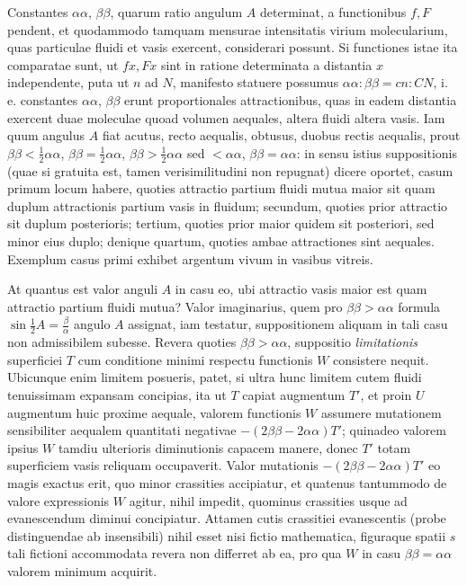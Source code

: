 Constantes $\alpha\alpha$, $\beta\beta$, quarum ratio angulum $A$ determinat, a functionibus $f,F$ pendent, et quodammodo tamquam mensurae intensitatis virium molecularium, quas particulae fluidi et vasis exercent, considerari possunt. Si functiones istae ita comparatae sunt, ut $fx,Fx$ sint in ratione determinata a distantia $x$ independente, puta ut $n$ ad $N$, manifesto statuere possumus
$\alpha\alpha:\beta\beta=cn:CN$, i. e. constantes $\alpha\alpha$, $\beta\beta$ erunt proportionales attractionibus, quas in eadem distantia exercent duae moleculae quoad volumen aequales, altera fluidi altera vasis. Iam quum angulus $A$ fiat acutus, recto aequalis, obtusus, duobus rectis aequalis, prout $\beta\beta<\frac12\alpha\alpha$, $\beta\beta=\frac12\alpha\alpha$, $\beta\beta>\frac12\alpha\alpha$ sed $<\alpha\alpha$, $\beta\beta=\alpha\alpha$: in sensu istius suppositionis (quae si gratuita est, tamen verisimilitudini non repugnat) dicere oportet, casum primum locum habere, quoties attractio partium fluidi mutua maior sit quam duplum attractionis partium vasis in fluidum; secundum, quoties prior attractio sit duplum posterioris; tertium, quoties prior maior quidem sit posteriori, sed minor eius duplo; denique quartum, quoties ambae attractiones sint aequales. Exemplum casus primi exhibet argentum vivum in vasibus vitreis.

At quantus est valor anguli $A$ in casu eo, ubi attractio vasis maior est quam attractio partium fluidi mutua? Valor imaginarius, quem pro $\beta\beta>\alpha\alpha$ formula $\sin\frac12 A=\frac\beta\alpha$ angulo $A$ assignat, iam testatur, suppositionem aliquam in tali casu non admissibilem subesse. Revera quoties $\beta\beta>\alpha\alpha$, suppositio \textit{limitationis} superficiei $T$ cum conditione minimi respectu functionis $W$ consistere nequit. Ubicunque enim limitem posueris, patet, si ultra hunc limitem cutem fluidi tenuissimam expansam concipias, ita ut $T$ capiat augmentum $T'$, et proin $U$ augmentum huic proxime aequale, valorem functionis $W$ assumere mutationem sensibiliter aequalem quantitati negativae $-(2\beta\beta-2\alpha\alpha)T'$; quinadeo valorem ipsius $W$ tamdiu ulterioris diminutionis capacem manere, donec $T'$ totam superficiem vasis reliquam occupaverit. Valor mutationis $-(2\beta\beta-2\alpha\alpha)T'$ eo magis exactus erit, quo minor crassities accipiatur, et quatenus tantummodo de valore expressionis $W$ agitur, nihil impedit, quominus crassities usque ad evanescendum diminui concipiatur. Attamen cutis crassitiei evanescentis (probe distinguendae ab insensibili) nihil esset nisi fictio mathematica, figuraque spatii $s$ tali fictioni accommodata revera non differret ab ea, pro qua $W$ in casu $\beta\beta=\alpha\alpha$ valorem minimum acquirit.

